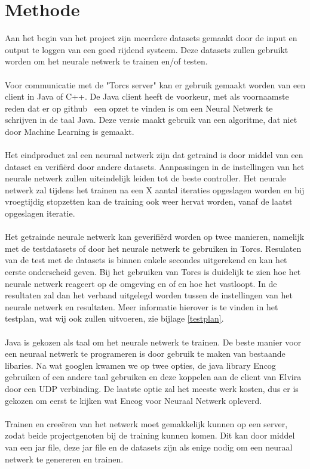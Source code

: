 \documentclass{article}
\begin{document}
\pagebreak
\pagebreak

\pagebreak
\section{Methode}
Aan het begin van het project zijn meerdere datasets gemaakt door de input en output te loggen van een goed rijdend systeem. Deze datasets zullen gebruikt worden om het neurale netwerk te trainen en/of testen.\\\\ 
Voor communicatie met de "Torcs server" kan er gebruik gemaakt worden van een client in Java of C++. De Java client heeft de voorkeur, met als voornaamste reden dat er op github~\cite{java-client} een opzet te vinden is om een Neural Netwerk te schrijven in de taal Java. Deze versie maakt gebruik van een algoritme, dat niet door Machine Learning is gemaakt. \\\\
Het eindproduct zal een neuraal netwerk zijn dat getraind is door middel van een dataset en verifi\"erd door andere datasets. Aanpassingen in de instellingen van het neurale netwerk zullen uiteindelijk leiden tot de beste controller. Het neurale netwerk zal tijdens het trainen na een X aantal iteraties opgeslagen worden en bij vroegtijdig stopzetten kan de training ook weer hervat worden, vanaf de laatst opgeslagen iteratie. \\\\
Het getrainde neurale netwerk kan geverifi\"erd worden op twee manieren, namelijk met de testdatasets of door het neurale netwerk te gebruiken in Torcs. Resulaten van de test met de datasets is binnen enkele secondes uitgerekend en kan het eerste onderscheid geven. Bij het gebruiken van Torcs is duidelijk te zien hoe het neurale netwerk reageert op de omgeving en of en hoe het vastloopt. In de resultaten zal dan het verband uitgelegd worden tussen de instellingen van het neurale netwerk en resultaten. Meer informatie hierover is te vinden in het testplan, wat wij ook zullen uitvoeren, zie bijlage \ref{testplan}. \\\\
Java is gekozen als taal om het neurale netwerk te trainen. De beste manier voor een neuraal netwerk te programeren is door gebruik te maken van bestaande libaries. Na wat googlen kwamen we op twee opties, de java library Encog gebruiken\cite{encog} of een andere taal gebruiken en deze koppelen aan de client van Elvira door een UDP verbinding. De laatste optie zal het meeste werk kosten, dus er is gekozen om eerst te kijken wat Encog voor Neuraal Netwerk opleverd. 
\\\\
Trainen en cree\"eren van het netwerk moet gemakkelijk kunnen op een server, zodat beide projectgenoten bij de training kunnen komen. Dit kan door middel van een jar file, deze jar file en de datasets zijn als enige nodig om een neuraal netwerk te genereren en trainen.
\pagebreak
\end{document}

